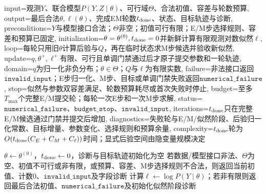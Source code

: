 \begin{AlgorithmContract}{
  input={观测$Y$、联合模型$P(Y,Z\mid\theta)$、可行域$\Theta$、合法初值、容差与轮数预算},
  output={最后合法$\theta,\ell(\theta)$、完成EM轮数$t_{\rm done}$、状态、目标轨迹与诊断},
  preconditions={$Y$与模型接口合法；$\Theta$非空；初值可行有限；E/M步选择规则、容差和预算已固定},
  initialization={$\theta=\theta^{(0)},t_{\rm done}=0$并新鲜计算有限观测对数似然$\ell$},
  loop={每轮只用旧$\theta$计算后验与$Q$，再在临时状态求M步候选并验收新似然},
  update={$q,\theta^+,\ell^+$有限、可行且单调门禁通过后才原子提交参数和一轮轨迹},
  domain={$q$为归一化非负分布；$\theta\in\Theta$；$Q$与$\ell$为有限实数},
  failure={非法接口返回$\mathtt{invalid\_input}$；E步归一化、M步、目标或单调门禁失败返回$\mathtt{numerical\_failure}$},
  stop={似然与参数双容差满足、轮数预算耗尽或首次失败时停止},
  budget={至多$T_{\max}$个完整E/M提交轮；每轮一次E步和一次M步求解},
  status={$\mathtt{numerical\_failure}$、$\mathtt{budget\_stop}$、$\mathtt{invalid\_input}$},
  iterations={$t_{\rm done}$只在完整E/M候选通过门禁并提交后增加},
  diagnostics={失败轮与E/M/似然阶段、后验归一化常数、目标增量、参数变化、选择规则和预算余量},
  complexity={$t_{\rm done}$轮为$O(t_{\rm done}(C_E+C_M+C_\ell))$时间；显式后验空间由隐变量规模决定}
}
\begin{algorithm}[H]
\caption{EM算法}\label{alg:V3-C04-em}
$\theta\leftarrow\theta^{(0)}$，$t_{\rm done}\leftarrow0$，诊断与目标轨迹初始化为空\;
若数据/模型接口非法、$\Theta$为空、初值不可行或非有限，或预算、容差、M步选择规则不合法，则返回当前初值、计数$0$、$\mathtt{invalid\_input}$及字段诊断\;
计算$\ell\leftarrow\log P(Y\mid\theta)$；若非有限则返回最后合法初值、$\mathtt{numerical\_failure}$及初始化似然阶段诊断\;
\end{algorithm}
\end{AlgorithmContract}
